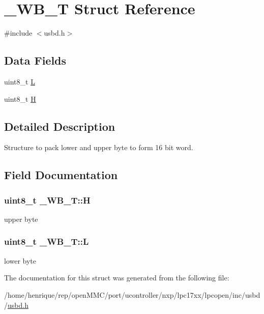 \hypertarget{struct__WB__T}{\section{\-\_\-\-W\-B\-\_\-\-T Struct Reference}
\label{struct__WB__T}
}


{\ttfamily \#include $<$usbd.\-h$>$}

\subsection*{Data Fields}
\begin{DoxyCompactItemize}
\item 
uint8\-\_\-t \hyperlink{struct__WB__T_a29f33d98a209b8353b29f66cd48de5e8}{L}
\item 
uint8\-\_\-t \hyperlink{struct__WB__T_af5f6d47d99f6e1c34cde41a71607d09d}{H}
\end{DoxyCompactItemize}


\subsection{Detailed Description}
Structure to pack lower and upper byte to form 16 bit word. 

\subsection{Field Documentation}
\hypertarget{struct__WB__T_af5f6d47d99f6e1c34cde41a71607d09d}{
\subsubsection[{H}]{\setlength{\rightskip}{0pt plus 5cm}uint8\-\_\-t \-\_\-\-W\-B\-\_\-\-T\-::\-H}}\label{struct__WB__T_af5f6d47d99f6e1c34cde41a71607d09d}
upper byte \hypertarget{struct__WB__T_a29f33d98a209b8353b29f66cd48de5e8}{
\subsubsection[{L}]{\setlength{\rightskip}{0pt plus 5cm}uint8\-\_\-t \-\_\-\-W\-B\-\_\-\-T\-::\-L}}\label{struct__WB__T_a29f33d98a209b8353b29f66cd48de5e8}
lower byte 

The documentation for this struct was generated from the following file\-:\begin{DoxyCompactItemize}
\item 
/home/henrique/rep/open\-M\-M\-C/port/ucontroller/nxp/lpc17xx/lpcopen/inc/usbd/\hyperlink{usbd_8h}{usbd.\-h}\end{DoxyCompactItemize}
